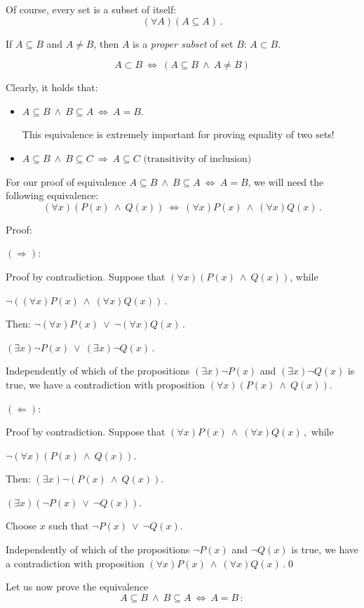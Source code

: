 \documentclass[11pt,paper=b5,footinclude,headinclude]{scrbook} %
\def\ali {{~\vee~}}
\def\inn {{~\wedge~}}
\def\sledi {{~\Rightarrow~}}
\def\cee {{~\Leftrightarrow~}}
\theoremstyle{remark}
\theoremstyle{definition} %
\theoremstyle{theorem} %
\begin{document}
Of course, every set is a subset of itself: $$(\forall A)(A\subseteq A)\,.$$

If $A\subseteq B$ and $A\neq B$, then $A$ is a  {\em proper subset } of set $B$: $A\subset B$.

$$A\subset B\cee (A\subseteq B \inn A\neq B)$$

Clearly, it holds that:
\begin{itemize}
  \item $A\subseteq B \inn B\subseteq A \cee A = B$.

  This equivalence is extremely important for proving equality of two sets!
  \item $A\subseteq B \inn B\subseteq C \sledi A \subseteq C \textrm{~(transitivity of inclusion)}$
\end{itemize}

For our proof of equivalence $A\subseteq B \inn B\subseteq A \cee A = B$, we will need the following
equivalence:
$$(\forall x)(P(x)\inn Q(x))\cee (\forall x)P(x)\inn (\forall x)Q(x)\,.$$

Proof:

$(\Rightarrow)$:

Proof by contradiction.
Suppose that $(\forall x)(P(x)\inn Q(x))$, while

$\neg((\forall x)P(x)\inn (\forall x)Q(x))\,.$

Then:
$\neg(\forall x)P(x)\ali \neg (\forall x)Q(x)\,.$

$(\exists  x)\neg P(x)\ali (\exists x)\neg Q(x)\,.$

Independently of which of the propositions $(\exists  x)\neg P(x)$
and $(\exists  x)\neg Q(x)$ is true, we have a contradiction with proposition
$(\forall x)(P(x)\inn Q(x))$.

$(\Leftarrow)$:

Proof by contradiction.
Suppose that $(\forall x)P(x)\inn (\forall x)Q(x)\,,$ while

$\neg (\forall x)(P(x)\inn Q(x))$.

Then:
$(\exists  x)\neg (P(x)\inn Q(x))$.

$(\exists  x)(\neg P(x)\ali \neg Q(x))$.

Choose $x$ such that $\neg P(x)\ali \neg Q(x)$.

Independently of which of the propositions $\neg P(x)$ and $\neg Q(x)$
is true, we have a contradiction with proposition
$(\forall x)P(x)\inn (\forall x)Q(x)\,.$\qed

\bigskip
Let us now prove the equivalence
$$A\subseteq B \inn B\subseteq A \cee A = B\,:$$
\end{document}
